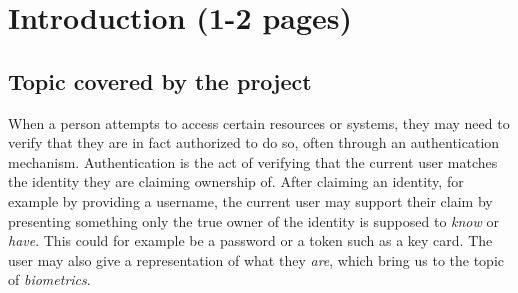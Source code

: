 \documentclass[informationsecurity]{gucmasterproject}
\begin{document}
%
%

\chapter{Introduction (1-2 pages)}

\section{Topic covered by the project}
\label{sec:topic}
When a person attempts to access certain resources or systems, they may need to verify that they are in fact authorized to do so, often through an authentication mechanism.
Authentication is the act of verifying that the current user matches the identity they are claiming ownership of.
After claiming an identity, for example by providing a username, the current user may support their claim by presenting something only the true owner of the identity is supposed to \textit{know} or \textit{have}.
This could for example be a password or a token such as a key card.
The user may also give a representation of what they \textit{are}, which bring us to the topic of \textit{biometrics}.
\end{document}
